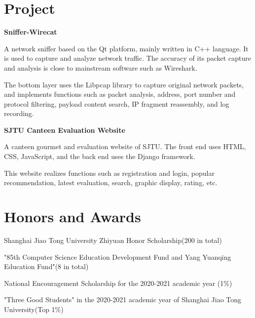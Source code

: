 \documentclass{cv_en}
\begin{document}
\section{Project}
\textbf{Sniffer-Wirecat}\enskip \underline{\href{https://github.com/WxxW2002/WireCat}{\faGithub}}
\begin{zitemize}
  \item A network sniffer based on the Qt platform, mainly written in C++ language. It is used to capture and analyze network traffic. The accuracy of its packet capture and analysis is close to mainstream software such as Wireshark.
  \item The bottom layer uses the Libpcap library to capture original network packets, and implements functions such as packet analysis, address, port number and protocol filtering, payload content search, IP fragment reassembly, and log recording.
\end{zitemize}

\textbf{SJTU Canteen Evaluation Website}\enskip \underline{\href{https://github.com/WxxW2002/SJTU-canteen}{\faGithub}}
\begin{zitemize}
  \item A canteen gourmet and evaluation website of SJTU. The front end uses HTML, CSS, JavaScript, and the back end uses the Django framework.
  \item This website realizes functions such as registration and login, popular recommendation, latest evaluation, search, graphic display, rating, etc.
\end{zitemize}

\section{Honors and Awards}
\begin{zitemize}
  \item Shanghai Jiao Tong University Zhiyuan Honor Scholarship(200 in total)
  \item "85th Computer Science Education Development Fund and Yang Yuanqing Education Fund"(8 in total)
  \item National Encouragement Scholarship for the 2020-2021 academic year (1\%)
  \item "Three Good Students" in the 2020-2021 academic year of Shanghai Jiao Tong University(Top 1\%)
\end{zitemize}

\end{document}
